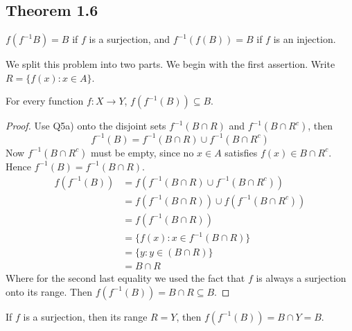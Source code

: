 \documentclass[../../main.tex]{subfiles}
\begin{document}
\subsection{Theorem 1.6}
\begin{wts} %
   $f(f^{-1}B)=B$ if $f$ is a surjection, and $f^{-1}(f(B))=B$ if $f$ is an injection.
\end{wts}
We split this problem into two parts. We begin with the first assertion. Write $R = \{f(x): x\in A\}$.

    \begin{lemma}
        For every function $f: X\to Y$, $f(f^{-1}(B))\subseteq B$.
    \end{lemma}
    \begin{proof}
        Use Q5a) onto the disjoint sets $f^{-1}(B\cap R)$ and $f^{-1}(B\cap R^c)$, then 
        \[
            f^{-1}(B) = f^{-1}(B\cap R)\cup f^{-1}(B\cap R^c)
        \]
        Now $f^{-1}(B\cap R^c)$ must be empty, since no $x\in A$ satisfies $f(x) \in B\cap R^c$. Hence $f^{-1}(B) = f^{-1}(B\cap R)$.
        \begin{align*}
            f(f^{-1}(B)) &= f(f^{-1}(B\cap R)\cup f^{-1}(B\cap R^c))\\
            &= f(f^{-1}(B\cap R)) \cup f(f^{-1}(B\cap R^c))\\
            &= f(f^{-1}(B\cap R))\\
            &= \{f(x): x\in f^{-1}(B\cap R)\}\\
            &= \{y: y\in (B\cap R)\}\\
            &= B\cap R
        \end{align*}
        Where for the second last equality we used the fact that $f$ is always a surjection onto its range. Then $f(f^{-1}(B))=B\cap R\subseteq B$.
    \end{proof}
    \begin{remark}
        If $f$ is a surjection, then its range $R = Y$, then $f(f^{-1}(B)) = B\cap Y = B$.
    \end{remark}
\end{document}
